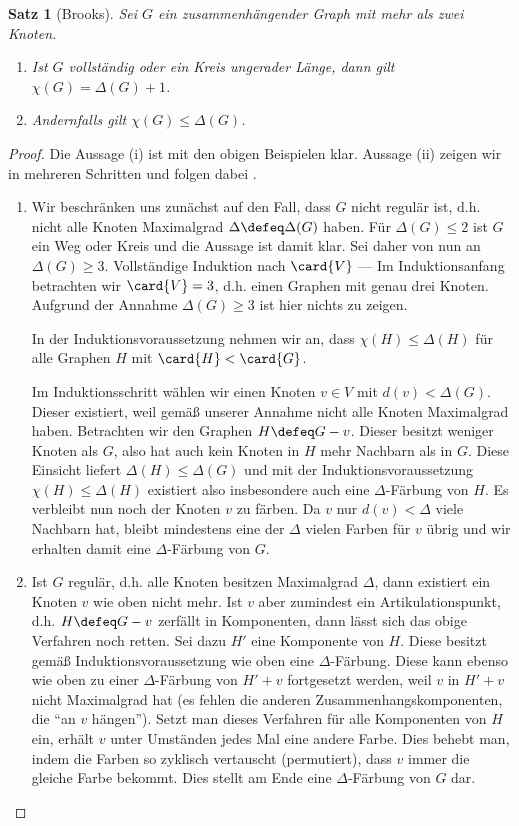 \documentclass[ngerman, a4paper, 12pt]{article}
\newcounter{themcount}
\theoremstyle{plain}
\newtheorem{satz}[themcount]{Satz}
\theoremstyle{break}
\theoremstyle{proofstyle}
\newtheorem{proof}{Beweis}
\begin{document}
	\begin{satz}[Brooks]\label{satz: brooks}
		Sei $G$ ein zusammenhängender Graph mit mehr als zwei Knoten.
		\begin{enumerate}[label=(\roman*), nolistsep, topsep=-\parskip]
			\item Ist $G$ vollständig oder ein Kreis ungerader Länge, dann gilt $\chi(G) = \Delta(G) + 1$.
			\item Andernfalls gilt $\chi(G) \le \Delta(G)$.
		\end{enumerate}
	\end{satz}
	\begin{proof}
		Die Aussage (i) ist mit den obigen Beispielen klar. Aussage (ii) zeigen wir in mehreren Schritten und folgen dabei \cite{Cranston2014}.
		\begin{enumerate}[label=Fall \arabic* ---, leftmargin=*, itemindent=*]
			\item Wir beschränken uns zunächst auf den Fall, dass $G$ nicht regulär ist, d.h. nicht alle Knoten Maximalgrad $\Delta \defeq \Delta(G)$ haben. 
			Für $\Delta(G) \le 2$ ist $G$ ein Weg oder Kreis und die Aussage ist damit klar. Sei daher von nun an $\Delta(G) \ge 3$.
			Vollständige Induktion nach $\card{V}$ --- Im Induktionsanfang betrachten wir $\card{V} = 3$, d.h. einen Graphen mit genau drei Knoten. Aufgrund der Annahme $\Delta(G) \ge 3$ ist hier nichts zu zeigen. 
			
			In der Induktionsvoraussetzung nehmen wir an, dass $\chi(H) \le \Delta(H)$ für alle Graphen $H$ mit $\card{H} < \card{G}$. 
			
			Im Induktionsschritt wählen wir einen Knoten $v \in V$ mit $d(v) < \Delta(G)$. Dieser existiert, weil gemäß unserer Annahme nicht alle Knoten Maximalgrad haben. 
			Betrachten wir den Graphen $H \defeq G - v$. 
			Dieser besitzt weniger Knoten als $G$, also hat auch kein Knoten in $H$ mehr Nachbarn als in $G$. Diese Einsicht liefert $\Delta(H) \le \Delta(G)$ und mit der Induktionsvoraussetzung $\chi(H) \le \Delta(H)$ existiert also insbesondere auch eine $\Delta$-Färbung von $H$. 
			Es verbleibt nun noch der Knoten $v$ zu färben. Da $v$ nur $d(v) < \Delta$ viele Nachbarn hat, bleibt mindestens eine der $\Delta$ vielen Farben für $v$ übrig und wir erhalten damit eine $\Delta$-Färbung von $G$.
		
			\item Ist $G$ regulär, d.h. alle Knoten besitzen Maximalgrad $\Delta$, dann existiert ein Knoten $v$ wie oben nicht mehr. Ist $v$ aber zumindest ein Artikulationspunkt, d.h. $H \defeq G - v$ zerfällt in Komponenten, dann lässt sich das obige Verfahren noch retten. Sei dazu $H'$ eine Komponente von $H$. Diese besitzt gemäß Induktionsvoraussetzung wie oben eine $\Delta$-Färbung. Diese kann ebenso wie oben zu einer $\Delta$-Färbung von $H' + v$ fortgesetzt werden, weil $v$ in $H' + v$ nicht Maximalgrad hat (es fehlen die anderen Zusammenhangskomponenten, die \enquote{an $v$ hängen}). Setzt man dieses Verfahren für alle Komponenten von $H$ ein, erhält $v$ unter Umständen jedes Mal eine andere Farbe. Dies behebt man, indem die Farben so zyklisch vertauscht (permutiert), dass $v$ immer die gleiche Farbe bekommt. Dies stellt am Ende eine $\Delta$-Färbung von $G$ dar.
		

\end{enumerate}
\end{proof}
\end{document}
